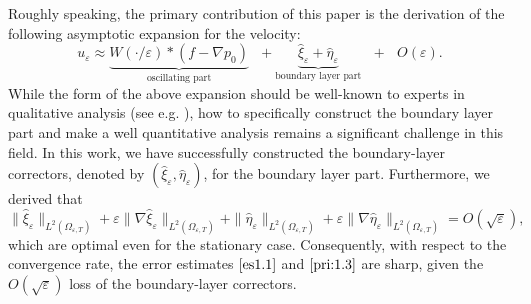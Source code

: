 \documentclass[13pt,CJK]{article}
\theoremstyle{plain}                       %
\theoremstyle{remark}
\numberwithin{equation}{section}
\begin{document}
Roughly speaking, the primary contribution of this paper is the derivation of the following asymptotic expansion for the velocity:
\begin{equation}\label{expan:1}
u_\varepsilon \approx \underbrace{W(\cdot/\varepsilon)\ast (f-\nabla p_0)}_{\text{oscillating~part}}
~~~+
\underbrace{\hat{\xi}_\varepsilon + \hat{\eta}_\varepsilon}_{\text{boundary~layer part}}
~~~+ ~~~O(\varepsilon).
\end{equation}
While the form of the above expansion should be well-known to experts in qualitative analysis (see e.g. \cite{Lions81}), how to specifically construct the boundary layer part
and make a well quantitative analysis remains a significant challenge in this field. In this work,  we have successfully constructed the boundary-layer correctors, denoted by  $(\hat{\xi}_\varepsilon,\hat{\eta}_\varepsilon)$, for the boundary layer part.
Furthermore, we derived that
\begin{equation}\label{k-2}
\|\hat{\xi}_\varepsilon\|_{L^2(\Omega_{\varepsilon,T})}
+\varepsilon\|\nabla\hat{\xi}_\varepsilon\|_{L^2(\Omega_{\varepsilon,T})}
+ \|\hat{\eta}_\varepsilon\|_{L^2(\Omega_{\varepsilon,T})}
+\varepsilon\|\nabla\hat{\eta}_\varepsilon\|_{L^2(\Omega_{\varepsilon,T})} = O(\sqrt{\varepsilon}),
\end{equation}
which are optimal even for the stationary case. Consequently,
with respect to the convergence rate,
the error estimates $\eqref{es1.1}$ and
$\eqref{pri:1.3}$ are sharp, given the $O(\sqrt{\varepsilon})$ loss
of the boundary-layer correctors.
\end{document}
